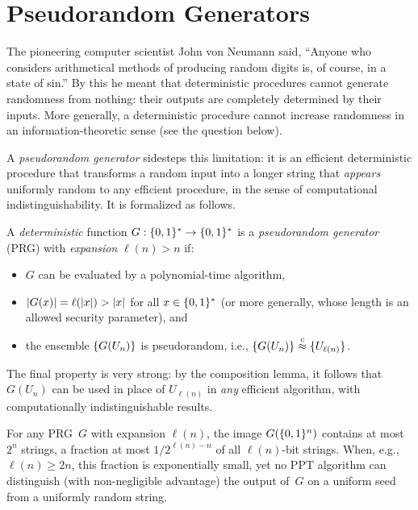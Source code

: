 \documentclass[11pt]{article}
\begin{document}
\thispagestyle{fancy}           %


\section{Pseudorandom Generators}
\label{sec:prgs}

The pioneering computer scientist John von Neumann said, “Anyone who considers arithmetical methods of producing random digits is, of course, in a state of sin.”
By this he meant that deterministic procedures cannot generate randomness from nothing: their outputs are completely determined by their inputs.
More generally, a deterministic procedure cannot increase randomness in an information-theoretic sense (see the question below).

A \emph{pseudorandom generator} sidesteps this limitation: it is an efficient deterministic procedure that transforms a random input into a longer string that \emph{appears} uniformly random to any efficient procedure, in the sense of computational indistinguishability.
It is formalized as follows.

\begin{definition}
  \label{def:prg}
  A \emph{deterministic} function $G : \{0,1\}^{*} \to \{0,1\}^{*}$ is a \emph{pseudorandom generator} (PRG) with \emph{expansion} $\ell(n) > n$ if:
  \begin{itemize}
  \item $G$ can be evaluated by a polynomial-time algorithm,
  \item $\lvert G(x)\rvert = \ell(\lvert x\rvert) > \lvert x\rvert$ for all $x \in \{0,1\}^{*}$ (or more generally, whose length is an allowed security parameter), and
  \item the ensemble $\{G(U_{n})\}$ is pseudorandom, i.e., $\{G(U_{n})\} \stackrel{c}{\approx} \{U_{\ell(n)}\}$.
  \end{itemize}
\end{definition}

The final property is very strong: by the composition lemma, it follows that $G(U_{n})$ can be used in place of $U_{\ell(n)}$ in \emph{any} efficient algorithm, with computationally indistinguishable results.

For any PRG~$G$ with expansion $\ell(n)$, the image $G(\{0,1\}^n)$ contains at most $2^n$ strings, a fraction at most $1/2^{\ell(n)-n}$ of all $\ell(n)$-bit strings.
When, e.g., $\ell(n)\geq 2n$, this fraction is exponentially small, yet no PPT algorithm can distinguish (with non-negligible advantage) the output of~$G$ on a uniform seed from a uniformly random string.
\end{document}
